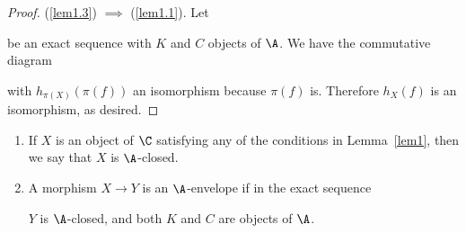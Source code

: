 \begin{lem}
\begin{proof}
    (\ref{lem1.3}) $\implies$ (\ref{lem1.1}).  Let
    \begin{center}
    \end{center}
    be an exact sequence with $K$ and $C$ objects of $\A$.
    We have the commutative diagram
    \begin{center}
    \end{center}
    with $h_{\pi(X)}(\pi(f))$ an isomorphism because $\pi(f)$ is.
    Therefore $h_X(f)$ is an isomorphism, as desired.
  \end{proof}
\end{lem}

\begin{defn}
  \begin{enumerate}
  \item
    If $X$ is an object of $\C$ satisfying any of the conditions in Lemma~\ref{lem1}, then we say that $X$ is $\A$-closed.
  \item
    A morphism $X \rightarrow Y$ is an $\A$-envelope if in the exact sequence
    \begin{center}
    \end{center}
    $Y$ is $\A$-closed, and both $K$ and $C$ are objects of $\A$.
  \end{enumerate}
\end{defn}

